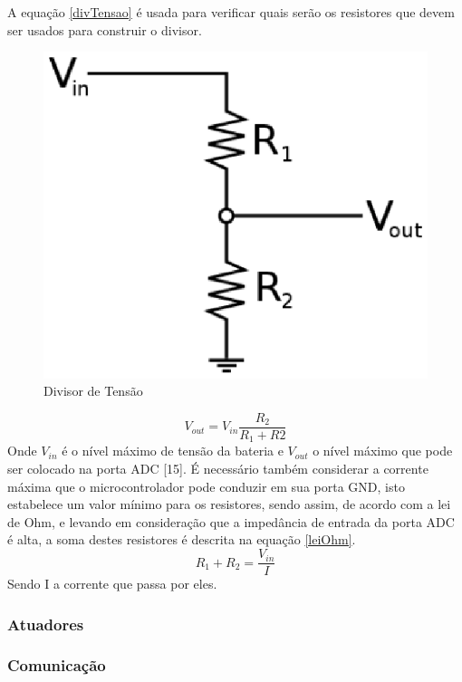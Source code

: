 A equação \ref{divTensao} é usada para verificar quais serão os resistores que devem ser usados para construir o divisor.

\begin{figure}[H]
 \centering
   \includegraphics[keepaspectratio=true,scale=0.8]{figuras/divisortensao.eps}
 \caption{Divisor de Tensão}
 \label{divisor_tensao}
\end{figure}

\begin{equation}
\label{divTensao}
	V_{out}=V_{in}\frac{R_{2}}{R_{1}+R{2}}
\end{equation}
Onde $V_{in}$ é o nível máximo de tensão da bateria e $V_{out}$ o nível máximo que pode ser colocado na porta ADC [15]. É necessário também considerar a corrente máxima que o microcontrolador pode conduzir em sua porta GND, isto estabelece um valor mínimo para os resistores, sendo assim, de acordo com a lei de Ohm, e levando em consideração que a impedância de entrada da porta ADC é alta, a soma destes resistores é descrita na equação \ref{leiOhm}.
\begin{equation}
\label{leiOhm}
	R_{1}+R_{2}=\frac{V_{in}}{I}
\end{equation}
Sendo I a corrente que passa por eles.

\subsubsection{Atuadores}

\subsubsection{Comunicação}

